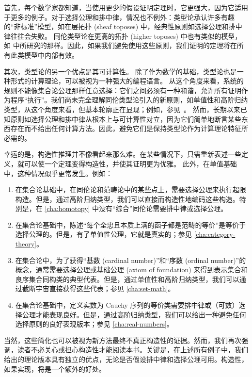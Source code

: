 首先，每个数学家都知道，当使用更少的假设证明定理时，它更强大，因为它适用于更多的例子。对于选择公理和排中律，情况也不例外：类型论承认许多有趣的“非标准”模型，如在层拓扑 (sheaf toposes) 中，经典性原则如选择公理和排中律往往会失败。
同伦类型论在更高的拓扑 (higher toposes) 中也有类似的模型，如 \cite{ToenVezzosi02,Rezk05,lurie:higher-topoi} 中所研究的那样。因此，如果我们避免使用这些原则，我们证明的定理将在所有此类模型中内部有效。

其次，类型论的另一个优点是其可计算性。
除了作为数学的基础，类型论也是一种形式的计算理论，可以被视为一种强大的编程语言。
从这个角度来看，系统的规则不能像集合论公理那样任意选择：它们之间必须有一种和谐，允许所有证明作为程序“执行”。我们尚未完全理解同伦类型论引入的新原则，如单值性和高阶归纳类型，从这个角度来看，但基本轮廓正在显现；例如，参见~\cite{lh:canonicity}。
然而，长期以来已知原则如选择公理和排中律从根本上与可计算性对立，因为它们简单地断言某些东西存在而不给出任何计算方法。因此，避免它们是保持类型论作为计算理论特征所必需的。

幸运的是，构造性推理并不像看起来那么难。在某些情况下，只需重新表述一些定义，就可以使一个定理变得构造性，并使其证明更为优雅。
此外，在单值基础中，这种情况似乎更常发生。例如：
\begin{enumerate}
    \item 在集合论基础中，在同伦论和范畴论中的某些点上，需要选择公理来执行超限构造。但是，通过高阶归纳类型，我们可以直接而构造性地编码这些构造。特别是，在 \cref{cha:homotopy} 中没有“综合”同伦论需要排中律或选择公理。
    \item 在集合论基础中，陈述“每个全忠且本质上满的函子都是范畴的等价”是等价于选择公理的。但是，有了单值性公理，它就是真实的；参见 \cref{cha:category-theory}。
    \item 在集合论中，为了获得“基数 (cardinal number)”和“序数 (ordinal number)”的概念，通常需要选择公理或基础公理 (axiom of foundation) 来得到表示集合和良序集合同构类的典型代表。但是，通过单值性和高阶归纳类型，我们可以通过截断宇宙直接获得这些代表；参见 \cref{cha:set-math}。
    \item 在集合论基础中，定义实数为 Cauchy 序列的等价类需要排中律或（可数）选择公理才能表现良好。但是，通过高阶归纳类型，我们可以给出一种避免任何选择原则的良好表现版本；参见 \cref{cha:real-numbers}。
\end{enumerate}
当然，这些简化也可以被视为新方法最终不真正构造性的证据。然而，我们再次强调，读者不必关心或担心构造性才能阅读本书。关键是，在上述所有例子中，我们给出的理论版本具有独立的优点，无论是否假设排中律和选择公理可用。构造性，如果实现，将是一个额外的好处。
%


